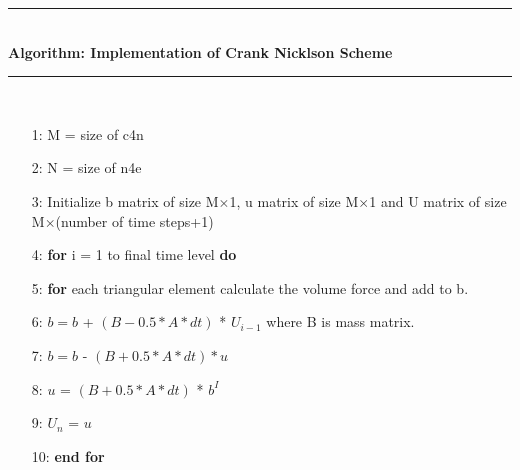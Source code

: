 \documentclass{report}
\numberwithin{equation}{chapter}
\begin{document}
\begin{spacing}{1.5}
\noindent\rule{12cm}{0.4pt}\\
\textbf{Algorithm: Implementation of Crank Nicklson Scheme}\\
\noindent\rule{12cm}{0.4pt}\\
\begin{itemize}
\item[1:] M = size of c4n
\item[2:] N = size of n4e
\item[3:] Initialize b matrix of size M$\times$1, u matrix of size M$\times$1 and U matrix of size M$\times$(number of time steps+1)
\item[4:] \textbf{for} i = 1 to final time level \textbf{do}
\item[5:] \textbf{for} each triangular element calculate the volume force and add to b.
\item[6:] $b = b$ + $(B-0.5*A*dt)$ * $U_{i-1}$ where B is mass matrix.
\item[7:] $b = b$ - $(B+0.5*A*dt)*u$
\item[8:] $u$ = $(B+0.5*A*dt)$ * $b^{I}$
\item[9:] $U_{n}$ = $u$
\item[10:] \textbf{end for}
\end{itemize}
\end{spacing}
\end{document}
